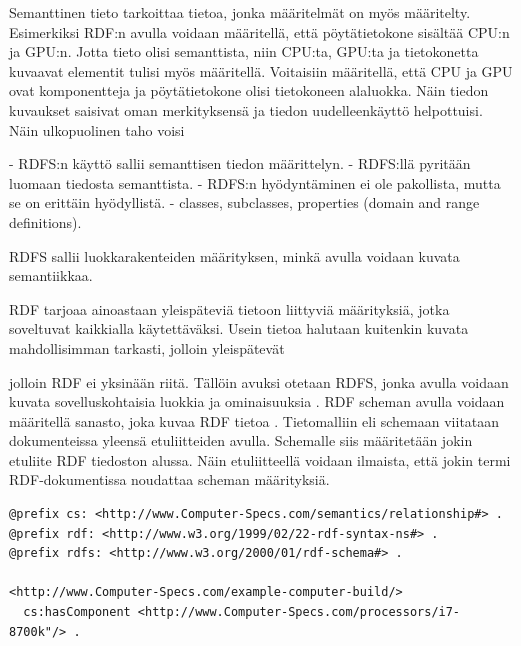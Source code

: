 \documentclass[finnish, 12pt, a4paper, elec, utf8, pdfa, online]{aaltothesis}
\begin{document}
Semanttinen tieto tarkoittaa tietoa, jonka määritelmät on myös määritelty. Esimerkiksi RDF:n avulla voidaan määritellä, että pöytätietokone sisältää CPU:n ja GPU:n. Jotta tieto olisi semanttista, niin CPU:ta, GPU:ta ja tietokonetta kuvaavat elementit tulisi myös määritellä. Voitaisiin määritellä, että CPU ja GPU ovat komponentteja ja pöytätietokone olisi tietokoneen alaluokka. Näin tiedon kuvaukset saisivat oman merkityksensä ja tiedon uudelleenkäyttö helpottuisi. Näin ulkopuolinen taho voisi

- RDFS:n käyttö sallii semanttisen tiedon määrittelyn.
- RDFS:llä pyritään luomaan tiedosta semanttista.
- RDFS:n hyödyntäminen ei ole pakollista, mutta se on erittäin hyödyllistä.
- classes, subclasses, properties (domain and range definitions).


RDFS sallii luokkarakenteiden määrityksen, minkä avulla voidaan kuvata semantiikkaa.


\cite{W3C_RDFS}

RDF tarjoaa ainoastaan yleispäteviä tietoon liittyviä määrityksiä, jotka soveltuvat kaikkialla käytettäväksi. Usein tietoa halutaan kuitenkin kuvata mahdollisimman tarkasti,
jolloin yleispätevät

jolloin RDF ei yksinään riitä. Tällöin avuksi otetaan RDFS, jonka avulla voidaan kuvata sovelluskohtaisia luokkia ja ominaisuuksia \cite{W3C_RDFS}. RDF scheman avulla voidaan määritellä sanasto, joka kuvaa RDF tietoa \cite{IEEE_XML}. Tietomalliin eli schemaan viitataan dokumenteissa yleensä etuliitteiden avulla. Schemalle siis määritetään jokin etuliite RDF tiedoston alussa. Näin etuliitteellä voidaan ilmaista, että jokin termi RDF-dokumentissa noudattaa scheman määrityksiä.

\vskip 0.75cm
\begin{lstlisting}[style=codeblock]
@prefix cs: <http://www.Computer-Specs.com/semantics/relationship#> .
@prefix rdf: <http://www.w3.org/1999/02/22-rdf-syntax-ns#> .
@prefix rdfs: <http://www.w3.org/2000/01/rdf-schema#> .

<http://www.Computer-Specs.com/example-computer-build/>
  cs:hasComponent <http://www.Computer-Specs.com/processors/i7-8700k"/> .
\end{lstlisting}
\vskip 0.75cm

\begin{figure}[htb]
\centering
\end{figure}
\end{document}
